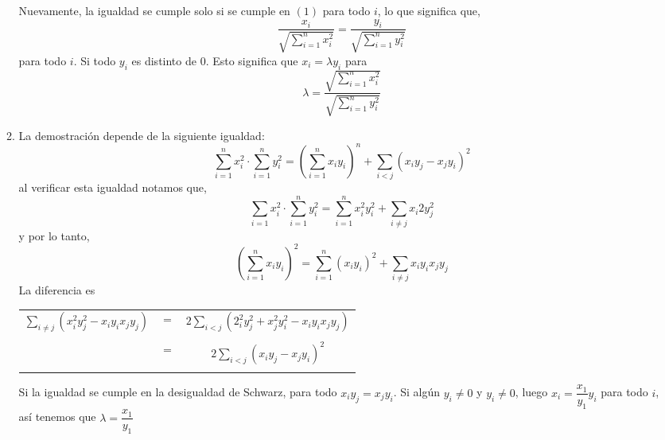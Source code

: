 \begin{enumerate}[\bfseries 1.]
\begin{enumerate}[\bfseries i)]
            Nuevamente, la igualdad se cumple solo si se cumple en $(1)$ para todo $i$, lo que significa que, 
            $$\dfrac{x_i}{\sqrt{\sum\limits_{i=1}^n x_i^2}} = \dfrac{y_i}{\sqrt{\sum\limits_{i=1}^n y_i^2}}$$
            para todo $i$. Si todo $y_i$ es distinto de $0$. Esto significa que $x_i=\lambda y_i$ para 
            $$\lambda = \dfrac{\sqrt{\sum\limits_{i=1}^n x_i^2}}{\sqrt{\sum\limits_{i=1}^n y_i^2}}$$
         \item La demostración depende de la siguiente igualdad:
            $$\sum\limits_{i=1}^n x_i^2 \cdot \sum\limits_{i=1}^n y_i^2 = \left( \sum\limits_{i=1}^n x_iy_i \right)^n + \sum\limits_{i<j} (x_i y_j -x_j y_i)^2$$
            al verificar esta igualdad notamos que,
            $$\sum\limits_{i=1}x_i^2 \cdot \sum\limits_{i=1}^n y_i^2 = \sum\limits_{i=1}^n x_i^2 y_i^2 + \sum\limits_{i\neq j} x_i2 y_j^2$$
             y por lo tanto,
             $$\left( \sum\limits_{i=1}^n x_i y_i \right)^2 = \sum\limits_{i=1}^n (x_i y_i)^2 + \sum\limits_{i\neq j} x_i y_i x_j y_j$$
             La diferencia es
             \begin{center} 
                \begin{tabular}{rlc}
                   $\sum\limits_{i \neq j} (x_i^2 y_j^2 - x_i y_i x_j y_j)$ & $=$ & $2 \sum\limits_{i<j} (2_i^2 y_j^2 + x_j^2 y_i^2 - x_i y_i x_j y_j)$\\\\
                      & $=$ & $2 \sum\limits_{i<j} (x_i y_j - x_j y_i)^2$\\\\
                \end{tabular}
             \end{center}
             Si la igualdad se cumple en la desigualdad de Schwarz, para todo $x_iy_j = x_j y_i$. Si algún $y_i \neq 0$ y $y_i \neq 0$, luego $x_i=\dfrac{x_1}{y_1}y_i$ para todo $i$, así tenemos que $\lambda = \dfrac{x_1}{y_1}$\\\\
      \end{enumerate}


\end{enumerate}
